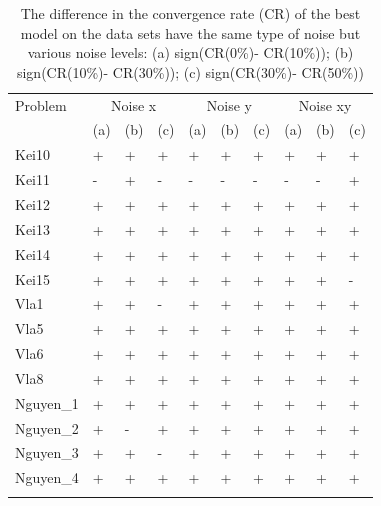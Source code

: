 \begin{table}
\caption{The difference in the convergence rate (CR) of the best model on the data sets have the same type of noise but various noise levels: (a) sign(CR(0\%)- CR(10\%)); (b) sign(CR(10\%)- CR(30\%)); (c) sign(CR(30\%)- CR(50\%)) }
\label{tab:difCR1}       %
\begin{tabular}{l|lll|lll|lll}
\hline\noalign{\smallskip}
Problem & \multicolumn{3}{c|}{Noise x} & \multicolumn{3}{c|}{Noise y} & \multicolumn{3}{c}{Noise xy} \\
 & (a) & (b) & (c) & (a) & (b) & (c) & (a) & (b) & (c) \\
\noalign{\smallskip}\hline\noalign{\smallskip}
Kei10 & + & + & + & + & + & + & + & + & + \\
Kei11 & - & + & - & - & - & - & - & - & + \\
Kei12 & + & + & + & + & + & + & + & + & + \\
Kei13 & + & + & + & + & + & + & + & + & + \\
Kei14 & + & + & + & + & + & + & + & + & + \\
Kei15 & + & + & + & + & + & + & + & + & - \\
Vla1 & + & + & - & + & + & + & + & + & + \\
Vla5 & + & + & + & + & + & + & + & + & + \\
Vla6 & + & + & + & + & + & + & + & + & + \\
Vla8 & + & + & + & + & + & + & + & + & + \\
Nguyen\_1 & + & + & + & + & + & + & + & + & + \\
Nguyen\_2 & + & - & + & + & + & + & + & + & + \\
Nguyen\_3 & + & + & - & + & + & + & + & + & + \\
Nguyen\_4 & + & + & + & + & + & + & + & + & + \\
\noalign{\smallskip}\hline
\end{tabular}
\end{table}
